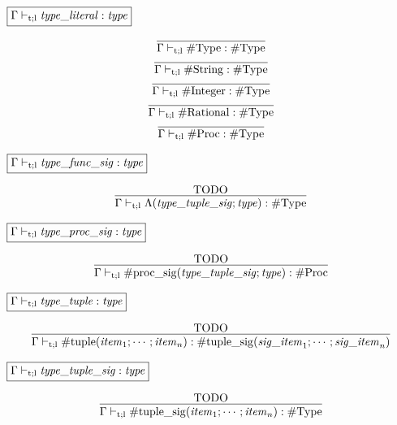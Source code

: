 $\fbox{$\Gamma \vdash_{\mathrm{t}; \mathrm{l}} \mathit{type\_literal}: \mathit{type}$}$

\begin{gather*}
    \infer{\Gamma \vdash_{\mathrm{t}; \mathrm{l}} \mathrm{\#Type}: \mathrm{\#Type}}{}
    \\
    \infer{\Gamma \vdash_{\mathrm{t}; \mathrm{l}} \mathrm{\#String}: \mathrm{\#Type}}{}
    \\
    \infer{\Gamma \vdash_{\mathrm{t}; \mathrm{l}} \mathrm{\#Integer}: \mathrm{\#Type}}{}
    \\
    \infer{\Gamma \vdash_{\mathrm{t}; \mathrm{l}} \mathrm{\#Rational}: \mathrm{\#Type}}{}
    \\
    \infer{\Gamma \vdash_{\mathrm{t}; \mathrm{l}} \mathrm{\#Proc}: \mathrm{\#Type}}{}
\end{gather*}

$\fbox{$\Gamma \vdash_{\mathrm{t}; \mathrm{l}} \mathit{type\_func\_sig}: \mathit{type}$}$

\begin{gather*}
    \infer{\Gamma \vdash_{\mathrm{t}; \mathrm{l}} \Lambda(\mathit{type\_tuple\_sig}; \mathit{type}): \mathrm{\#Type}}{
        \text{TODO}
    }
\end{gather*}

$\fbox{$\Gamma \vdash_{\mathrm{t}; \mathrm{l}} \mathit{type\_proc\_sig}: \mathit{type}$}$

\begin{gather*}
    \infer{\Gamma \vdash_{\mathrm{t}; \mathrm{l}} \mathrm{\#proc\_sig}(\mathit{type\_tuple\_sig}; \mathit{type}): \mathrm{\#Proc}}{
        \text{TODO}
    }
\end{gather*}

$\fbox{$\Gamma \vdash_{\mathrm{t}; \mathrm{l}} \mathit{type\_tuple}: \mathit{type}$}$

\begin{gather*}
    \infer{\Gamma \vdash_{\mathrm{t}; \mathrm{l}} \mathrm{\#tuple}(\mathit{item}_1; \cdots; \mathit{item}_n): \mathrm{\#tuple\_sig}(\mathit{sig\_item}_1; \cdots; \mathit{sig\_item}_n)}{
        \text{TODO}
    }
\end{gather*}

$\fbox{$\Gamma \vdash_{\mathrm{t}; \mathrm{l}} \mathit{type\_tuple\_sig}: \mathit{type}$}$

\begin{gather*}
    \infer{\Gamma \vdash_{\mathrm{t}; \mathrm{l}} \mathrm{\#tuple\_sig}(\mathit{item}_1; \cdots; \mathit{item}_n): \mathrm{\#Type}}{
        \text{TODO}
    }
\end{gather*}

